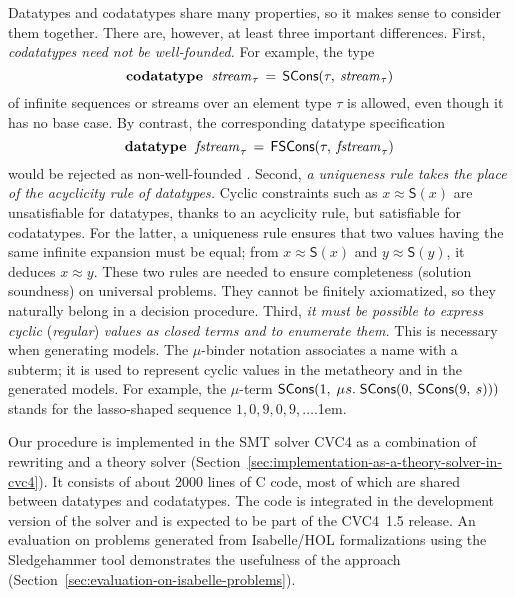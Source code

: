 \documentclass[smallcondensed,draft]{svjour3}
\newcommand\MU{\vvthinspace\mu\vvthinspace}
\newcommand\afterLdots{\kern.1em} %
\newcommand\cpp{C\nobreak\raisebox{.05ex}{+}\nobreak\raisebox{.05ex}{+}}
\newcommand\keyw[1]{\textbf{#1}}
\newcommand\const[1]{\textsf{#1}}
\newcommand\ty[1]{\textit{#1}}
\newcommand{\teq}{\approx}
\newcommand\vvthinspace{\kern+0.041667em}
\newcommand\vthinspace{\kern+0.083333em}
\begin{document}
Datatypes and codatatypes share many properties, so it makes sense
to consider them together. There are, however, at least three important
differences.
%
First, \emph{codatatypes need not be well-founded.}
For example, the type
$$\vthinspace\keyw{codatatype}~\;\ty{stream}_{\vthinspace\tau} \,=\allowbreak\, \const{SCons}(\tau,\allowbreak\: \ty{stream}_{\vthinspace\tau})\vthinspace$$
of infinite sequences or streams over an element type $\tau$ is
allowed, even though it has no base case. By contrast, the
corresponding datatype specification
$$\vthinspace\keyw{datatype}~\;\ty{fstream}_{\vthinspace\tau} \,=\allowbreak\, \const{FSCons}(\tau,\allowbreak\: \ty{fstream}_{\vthinspace\tau})\vthinspace$$
would be rejected as non-well-founded
\cite{blanchette-et-al-2015-esop}.
%
Second, \emph{a uniqueness rule takes the place of the acyclicity rule of datatypes.}
Cyclic constraints such as
$x \teq \const{S}(x)$ %
are unsatisfiable for datatypes,
thanks to an acyclicity rule,
but satisfiable for codatatypes. 
For the latter, a uniqueness rule ensures that two values
having the same infinite expansion must be equal; from $x
\teq \const{S}(x)$ and
$y \teq \const{S}(y)$, it deduces $x \teq y$.
These two rules are needed to ensure completeness
(solution soundness) on universal problems. %
They cannot be finitely axiomatized, so they naturally belong in
a decision procedure.
%
Third, \emph{it must be possible to express cyclic }(\emph{regular}) \emph{values as closed terms and
to enumerate them.} This is necessary when generating models.
The $\mu$-binder notation associates a name with
a subterm; it is used to represent cyclic values in the metatheory and
in the generated models. For example,
the $\mu$-term $\const{SCons}(1,\: \MU s.\; \const{SCons}(0,\: \const{SCons}(9,\: s)))$
stands for the lasso-shaped sequence $1, 0, 9, 0, 9, %
\ldots$\afterLdots.


Our procedure is implemented in the SMT solver CVC4 \cite{barrett-et-al-2011} as a combination
of rewriting and a theory solver (Section~\ref{sec:implementation-as-a-theory-solver-in-cvc4}).
It consists of about 2000 lines of \cpp{} code,
most of which are shared between datatypes and codatatypes. The code is
integrated in the development version of the solver and is expected to be part
of the CVC4~1.5 release.
%
An evaluation on %
problems generated from Isabelle/HOL \cite{nipkow-et-al-2002}
formalizations using the Sledgehammer tool \cite{blanchette-et-al-2013-smt}
demonstrates the usefulness of the approach (Section~\ref{sec:evaluation-on-isabelle-problems}).
\end{document}
